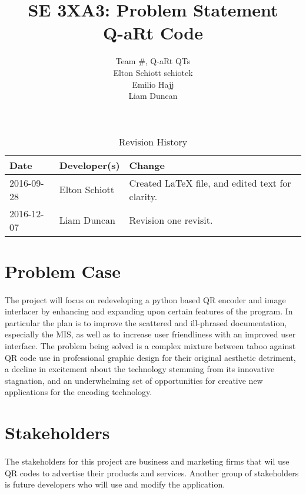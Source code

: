 \documentclass{article}
\title{SE 3XA3: Problem Statement\\Q-aRt Code}
\author{Team \#, Q-aRt QTs
		\\ Elton Schiott schiotek
		\\ Emilio Hajj
		\\ Liam Duncan
}
\date{}
\begin{document}
\begin{table}[hp]
\caption{Revision History} \label{TblRevisionHistory}
\begin{tabularx}{\textwidth}{llX}
\toprule
\textbf{Date} & \textbf{Developer(s)} & \textbf{Change}\\
\midrule
2016-09-28 & Elton Schiott & Created LaTeX file, and edited text for clarity.\\
2016-12-07 & Liam Duncan & Revision one revisit.\\
\bottomrule
\end{tabularx}
\end{table}

\newpage

\maketitle

\section{Problem Case}
	
	\paragraph{}
	
		The project will focus on redeveloping a python based QR 
		encoder and image interlacer by enhancing and expanding upon certain features of the program. 
		In particular the plan is to improve the scattered and ill-phrased documentation, especially the MIS, as well as to increase
		user friendliness with an improved user interface. The problem being solved
		is a complex mixture between taboo against QR code use in professional graphic
		design for their original aesthetic detriment, a decline in excitement
		about the technology stemming from its innovative stagnation, and an underwhelming
		set of opportunities for creative new applications for the encoding technology.
	
\section{Stakeholders}

	\paragraph{}
	
		The stakeholders for this project are business and marketing firms that 
		wil use QR codes to advertise their products and services. Another 
		group of stakeholders is future developers who will use and modify the 
		application.
	
\end{document}
